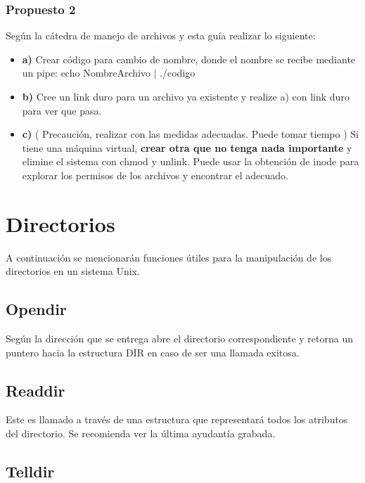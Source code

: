 \documentclass[journal]{IEEEtai}
\begin{document}
\subsubsection{Propuesto 2} Según la cátedra de manejo de archivos y esta guía realizar lo siguiente:

\begin{itemize}
\item \textbf{a)} Crear código para cambio de nombre, donde el nombre se recibe mediante un pipe: echo NombreArchivo $|$ ./codigo
\item \textbf{b)} Cree un link duro para un archivo ya existente y realize a) con link duro para ver que pasa.
\item \textbf{c)} ( Precaución, realizar con las medidas adecuadas. Puede tomar tiempo ) Si tiene una máquina virtual, \textbf{crear otra que no tenga nada importante} y elimine el sistema con chmod y unlink. Puede usar la obtención de inode para explorar los permisos de los archivos y encontrar el adecuado.
\end{itemize}

\section{Directorios}

A continuación se mencionarán funciones útiles para la manipulación de los directorios en un sistema Unix.

\subsection{Opendir}



Según la dirección que se entrega abre el directorio correspondiente y retorna un puntero hacia la estructura DIR en caso de ser una llamada exitosa.

\subsection{Readdir}



Este es llamado a través de una estructura que representará todos los atributos del directorio. Se recomienda ver la última ayudantía grabada.

\subsection{Telldir}
\end{document}
